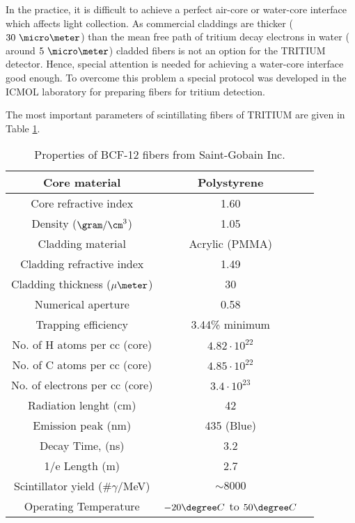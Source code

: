 In the practice, it is difficult to achieve a perfect air-core or water-core interface which affects light collection. As commercial claddings are thicker ($30~\micro \meter$) than the mean free path of tritium decay electrons in water ( around $5~\micro\meter$) cladded fibers is not an option for the TRITIUM detector. Hence, special attention is needed for achieving a water-core interface good enough. To overcome this problem a special protocol was developed in the ICMOL laboratory for preparing fibers for tritium detection.

The most important parameters of scintillating fibers of TRITIUM are given in Table \ref{tab:ParametersFibersBCF12}.

\begin{table}[h]
\begin{center}
\begin{tabular}{|c|c|c|}
\hline \hline 
Core material & Polystyrene \\ \hline
Core refractive index & 1.60 \\ \hline
Density ($\gram/\cm^3$) & 1.05 \\ \hline
Cladding material & Acrylic (PMMA) \\ \hline
Cladding refractive index & 1.49 \\ \hline
Cladding thickness ($\mu\meter$) & 30 \\ \hline
Numerical aperture & 0.58 \\ \hline
Trapping efficiency & 3.44\% minimum \\ \hline
No. of H atoms per cc (core) & $4.82 \cdot{} 10^{22}$ \\ \hline
No. of C atoms per cc (core) & $4.85 \cdot{} 10^{22}$ \\ \hline
No. of electrons per cc (core) & $3.4 \cdot{} 10^{23}$ \\ \hline
Radiation lenght (cm) & 42 \\ \hline
Emission peak (nm) & 435 (Blue) \\ \hline
Decay Time, (ns) & 3.2 \\ \hline
1/e Length (m) & 2.7 \\ \hline
Scintillator yield (\#$\gamma$/MeV) & $\sim 8000$ \\ \hline
Operating Temperature & $-20\degree C$ to $50\degree C$ \\ \hline
\end{tabular}
\caption{Properties of BCF-12 fibers from Saint-Gobain Inc. \cite{DataSheetBCF12Fiber}}
\label{tab:ParametersFibersBCF12}
\end{center}
\end{table}


